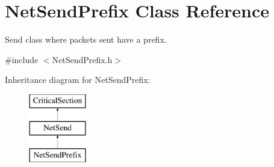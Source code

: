 \hypertarget{class_net_send_prefix}{
\section{NetSendPrefix Class Reference}
\label{class_net_send_prefix}
}


Send class where packets sent have a prefix.  




{\ttfamily \#include $<$NetSendPrefix.h$>$}

Inheritance diagram for NetSendPrefix:\begin{figure}[H]
\begin{center}
\leavevmode
\includegraphics[height=3.000000cm]{class_net_send_prefix}
\end{center}
\end{figure}
